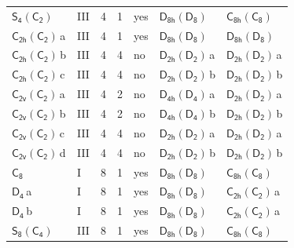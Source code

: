 \documentclass[10pt,a4paper]{article}
\numberwithin{equation}{section}
\newcommand{\grp}[1]{\mathsf{#1}}
\newcommand{\clsletter}[1]{\,{\scriptsize\color{black!55}#1}}
\begin{document}
{\begin{longtable}{@{}llrrlll@{}}
\href{S4-C2.pdf}{$\grp{S_{4}}(\grp{C_{2}})$} & III & 4 & 1 & yes & \href{D8h-D8.pdf}{$\grp{D_{8h}}(\grp{D_{8}})$} & \href{C8h-C8.pdf}{$\grp{C_{8h}}(\grp{C_{8}})$}\\
\href{C2h-C2.pdf}{$\grp{C_{2h}}(\grp{C_{2}})$}\clsletter{a} & III & 4 & 1 & yes & \href{D8h-D8.pdf}{$\grp{D_{8h}}(\grp{D_{8}})$} & \href{D8h-D8.pdf}{$\grp{D_{8h}}(\grp{D_{8}})$}\\
\href{C2h-C2.pdf}{$\grp{C_{2h}}(\grp{C_{2}})$}\clsletter{b} & III & 4 & 4 & no & \href{D2h-D2.pdf}{$\grp{D_{2h}}(\grp{D_{2}})$}\clsletter{a} & \href{D2h-D2.pdf}{$\grp{D_{2h}}(\grp{D_{2}})$}\clsletter{a}\\
\href{C2h-C2.pdf}{$\grp{C_{2h}}(\grp{C_{2}})$}\clsletter{c} & III & 4 & 4 & no & \href{D2h-D2.pdf}{$\grp{D_{2h}}(\grp{D_{2}})$}\clsletter{b} & \href{D2h-D2.pdf}{$\grp{D_{2h}}(\grp{D_{2}})$}\clsletter{b}\\
\href{C2v-C2.pdf}{$\grp{C_{2v}}(\grp{C_{2}})$}\clsletter{a} & III & 4 & 2 & no & \href{D4h-D4.pdf}{$\grp{D_{4h}}(\grp{D_{4}})$}\clsletter{a} & \href{D2h-D2.pdf}{$\grp{D_{2h}}(\grp{D_{2}})$}\clsletter{a}\\
\href{C2v-C2.pdf}{$\grp{C_{2v}}(\grp{C_{2}})$}\clsletter{b} & III & 4 & 2 & no & \href{D4h-D4.pdf}{$\grp{D_{4h}}(\grp{D_{4}})$}\clsletter{b} & \href{D2h-D2.pdf}{$\grp{D_{2h}}(\grp{D_{2}})$}\clsletter{b}\\
\href{C2v-C2.pdf}{$\grp{C_{2v}}(\grp{C_{2}})$}\clsletter{c} & III & 4 & 4 & no & \href{D2h-D2.pdf}{$\grp{D_{2h}}(\grp{D_{2}})$}\clsletter{a} & \href{D2h-D2.pdf}{$\grp{D_{2h}}(\grp{D_{2}})$}\clsletter{a}\\
\href{C2v-C2.pdf}{$\grp{C_{2v}}(\grp{C_{2}})$}\clsletter{d} & III & 4 & 4 & no & \href{D2h-D2.pdf}{$\grp{D_{2h}}(\grp{D_{2}})$}\clsletter{b} & \href{D2h-D2.pdf}{$\grp{D_{2h}}(\grp{D_{2}})$}\clsletter{b}\\
\href{../../../rotation/data/pdf/C8.pdf}{$\grp{C_{8}}$} & I & 8 & 1 & yes & \href{D8h-D8.pdf}{$\grp{D_{8h}}(\grp{D_{8}})$} & \href{C8h-C8.pdf}{$\grp{C_{8h}}(\grp{C_{8}})$}\\
\href{../../../rotation/data/pdf/D4.pdf}{$\grp{D_{4}}$}\clsletter{a} & I & 8 & 1 & yes & \href{D8h-D8.pdf}{$\grp{D_{8h}}(\grp{D_{8}})$} & \href{C2h-C2.pdf}{$\grp{C_{2h}}(\grp{C_{2}})$}\clsletter{a}\\
\href{../../../rotation/data/pdf/D4.pdf}{$\grp{D_{4}}$}\clsletter{b} & I & 8 & 1 & yes & \href{D8h-D8.pdf}{$\grp{D_{8h}}(\grp{D_{8}})$} & \href{C2h-C2.pdf}{$\grp{C_{2h}}(\grp{C_{2}})$}\clsletter{a}\\
\href{S8-C4.pdf}{$\grp{S_{8}}(\grp{C_{4}})$} & III & 8 & 1 & yes & \href{D8h-D8.pdf}{$\grp{D_{8h}}(\grp{D_{8}})$} & \href{C8h-C8.pdf}{$\grp{C_{8h}}(\grp{C_{8}})$}\\

\end{longtable}}
\end{document}
